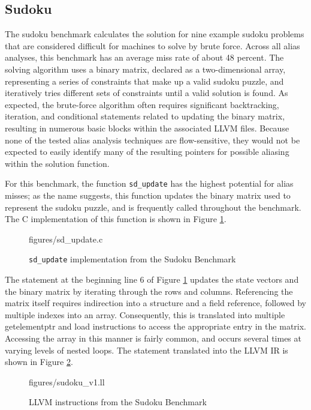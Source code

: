 \subsection{Sudoku}
The sudoku benchmark calculates the solution for nine example sudoku problems that are considered difficult for machines to solve by brute force. Across all alias analyses, this benchmark has an average miss rate of about 48 percent. The solving algorithm uses a binary matrix, declared as a two-dimensional array, representing a series of constraints that make up a valid sudoku puzzle, and iteratively tries different sets of constraints until a valid solution is found. As expected, the brute-force algorithm often requires significant backtracking, iteration, and conditional statements related to updating the binary matrix, resulting in numerous basic blocks within the associated LLVM files. Because none of the tested alias analysis techniques are flow-sensitive, they would not be expected to easily identify many of the resulting pointers for possible aliasing within the solution function.

For this benchmark, the function \texttt{sd\_update} has the highest potential for alias misses; as the name suggests, this function updates the binary matrix used to represent the sudoku puzzle, and is frequently called throughout the benchmark. The C implementation of this function is shown in Figure \ref{fig:sdc}.

\begin{figure} [h!]
   {figures/sd_update.c}
  \caption{\texttt{sd\_update} implementation from the Sudoku Benchmark}
  \label{fig:sdc}
\end{figure}

The statement at the beginning line 6 of Figure \ref{fig:sdc} updates the state vectors and the binary matrix by iterating through the rows and columns. Referencing the matrix itself requires indirection into a structure and a field reference, followed by multiple indexes into an array. Consequently, this is translated into multiple getelementptr and load instructions to access the appropriate entry in the matrix. Accessing the array in this manner is fairly common, and occurs several times at varying levels of nested loops. The statement translated into the LLVM IR is shown in Figure \ref{fig:sdll}.

\begin{figure} [h!]
   {figures/sudoku_v1.ll}
  \caption{LLVM instructions from the Sudoku Benchmark}
  \label{fig:sdll}
\end{figure}

